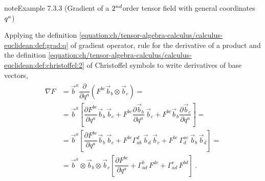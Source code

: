 \documentclass[letterpaper,10pt,english]{jupyterBook}
\begin{document}
\begin{sphinxadmonition}{note}{Example 7.3.3 (Gradient of a \protect\(2^{nd}\protect\)\sphinxhyphen{}order tensor field \sphinxhyphen{} with general coordinates \protect\(q^{a}\protect\))}



\sphinxAtStartPar
Applying the definition \eqref{equation:ch/tensor-algebra-calculus/calculus-euclidean:def:grad:q} of gradient operator, rule for the derivative of a product and the definition \eqref{equation:ch/tensor-algebra-calculus/calculus-euclidean:def:christoffel:2} of Christoffel symbols to write derivatives of base vectors,
\begin{equation*}
\begin{split}\begin{aligned}
  \nabla F 
  & = \vec{b}^a \dfrac{\partial}{\partial q^a} \left( F^{bc} \vec{b}_b \otimes \vec{b}_c \right) = \\
  & = \vec{b}^a \left[ \dfrac{\partial F^{bc}}{\partial q^a} \vec{b}_b \, \vec{b}_c + F^{bc} \dfrac{\partial \vec{b}_b}{\partial q^a} \, \vec{b}_c + F^{bc} \vec{b}_b \dfrac{\partial \vec{b}_c}{\partial q^a} \right] = \\
  & = \vec{b}^a \left[ \dfrac{\partial F^{bc}}{\partial q^a} \vec{b}_b \, \vec{b}_c + F^{bc} \Gamma_{ab}^d \, \vec{b}_d \, \vec{b}_c + F^{bc} \, \Gamma_{d}^{ac} \, \vec{b}_b \, \vec{b}_d \right] = \\
  & = \vec{b}^a \otimes \vec{b}_b \otimes \vec{b}_c \left[ \dfrac{\partial F^{bc}}{\partial q^a} + \Gamma_{ad}^b \, F^{dc} + \Gamma^{c}_{ad} \, F^{bd}  \right] \ .
\end{aligned}\end{split}
\end{equation*}\end{sphinxadmonition}
\end{document}
